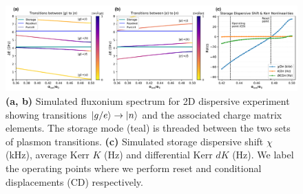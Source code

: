 \begin{figure}[h]
    \centering
    \includegraphics[width=\linewidth]{Figures/5/2D_dispersive_metrics.pdf}
    \caption{\textbf{(a, b)} Simulated fluxonium spectrum for 2D dispersive experiment showing transitions $\lvert g/e\rangle\to\lvert n\rangle$ and the associated charge matrix elements. The storage mode (teal) is threaded between the two sets of plasmon transitions. \textbf{(c)} Simulated storage dispersive shift $\chi$ (kHz), average Kerr $K$ (Hz) and differential Kerr $dK$ (Hz). We label the operating points where we perform reset and conditional displacements (CD) respectively.}
    \label{fig:5_2D_dispersive_metrics}
\end{figure}

